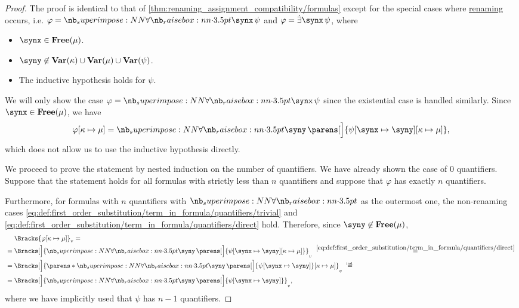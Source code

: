 \begin{proof}
   The proof is identical to that of \cref{thm:renaming_assignment_compatibility/formulas} except for the special cases where \hyperref[rem:first_order_substitution_renaming_justification]{renaming} occurs, i.e. \( \varphi = \qforall \synx \psi \) and \( \varphi = \qexists \synx \psi \), where
  \begin{itemize}
    \item \( \synx \in \op*{Free}(\mu) \).
    \item \( \syny \not\in \op*{Var}(\kappa) \cup \op*{Var}(\mu) \cup \op*{Var}(\psi) \).
    \item The inductive hypothesis holds for \( \psi \).
  \end{itemize}

  We will only show the case \( \varphi = \qforall \synx \psi \) since the existential case is handled similarly. Since \( \synx \in \op*{Free}(\mu) \), we have
  \begin{equation*}
    \varphi[\kappa \mapsto \mu]
    =
    \qforall \syny \parens[\Big]{ \psi[\synx \mapsto \syny][\kappa \mapsto \mu] },
  \end{equation*}
  which does not allow us to use the inductive hypothesis directly.

  We proceed to prove the statement by nested induction on the number of quantifiers. We have already shown the case of \( 0 \) quantifiers. Suppose that the statement holds for all formulas with strictly less than \( n \) quantifiers and suppose that \( \varphi \) has exactly \( n \) quantifiers.

  Furthermore, for formulas with \( n \) quantifiers with \( \synforall \) as the outermost one, the non-renaming cases \eqref{eq:def:first_order_substitution/term_in_formula/quantifiers/trivial} and \eqref{eq:def:first_order_substitution/term_in_formula/quantifiers/direct} hold. Therefore, since \( \syny \not\in \op*{Free}(\mu) \),
  \begin{equation}\label{eq:thm:first_order_substitution_equivalence/term_in_formula/nested_induction}
    \begin{aligned}
      &\phantom{{}={}}
      \Bracks{\varphi[\kappa \mapsto \mu]}_v
      = \\ &=
      \Bracks[\Big]{\qforall \syny \parens[\Big]{ \psi[\synx \mapsto \syny][\kappa \mapsto \mu] }}_v
      \reloset {\eqref{eq:def:first_order_substitution/term_in_formula/quantifiers/direct}} = \\ &=
      \Bracks[\Big]{ \parens*{ \qforall \syny \parens[\Big]{ \psi[\synx \mapsto \syny] } }[\kappa \mapsto \mu] }_v
      \reloset {\T{ind.}} = \\ &=
      \Bracks[\Big]{\qforall \syny \parens[\Big]{ \psi[\synx \mapsto \syny] } }_v,
    \end{aligned}
  \end{equation}
  where we have implicitly used that \( \psi \) has \( n - 1 \) quantifiers.


\end{proof}
